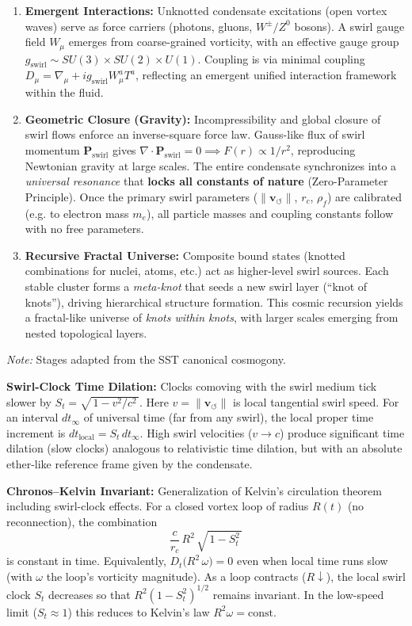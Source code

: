 \documentclass[10pt,a4paper]{article}
\begin{document}
\begin{tcolorbox}[title=\textbf{Cosmogenesis: Sevenfold Genesis of the Swirling Cosmos}]
\begin{enumerate}
\item \textbf{Emergent Interactions:} Unknotted condensate excitations (open vortex waves) serve as force carriers (photons, gluons, $W^\pm/Z^0$ bosons). A swirl gauge field $W_{\mu}$ emerges from coarse-grained vorticity, with an effective gauge group
$g_{\text{swirl}}\sim SU(3)\times SU(2)\times U(1)$. Coupling is via minimal coupling $D_\mu = \nabla_\mu + i g_{\text{swirl}} W^a_{\mu}T^a$, reflecting an emergent unified interaction framework within the fluid.
\item \textbf{Geometric Closure (Gravity):} Incompressibility and global closure of swirl flows enforce an inverse-square force law. Gauss-like flux of swirl momentum $\mathbf{P}_{\text{swirl}}$ gives $\nabla\cdot \mathbf{P}_{\text{swirl}}=0 \implies F(r)\propto 1/r^2$, reproducing Newtonian gravity at large scales. The entire condensate synchronizes into a \emph{universal resonance} that \textbf{locks all constants of nature} (Zero-Parameter Principle). Once the primary swirl parameters ($\| \mathbf{v}_{\!\boldsymbol{\circlearrowleft}}\|$, $r_c$, $\rho_{\!f}$) are calibrated (e.g. to electron mass $m_e$), all particle masses and coupling constants follow with no free parameters.
\item \textbf{Recursive Fractal Universe:} Composite bound states (knotted combinations for nuclei, atoms, etc.) act as higher-level swirl sources. Each stable cluster forms a \emph{meta-knot} that seeds a new swirl layer (``knot of knots''), driving hierarchical structure formation. This cosmic recursion yields a fractal-like universe of \emph{knots within knots}, with larger scales emerging from nested topological layers.
\end{enumerate}
    {\footnotesize \emph{Note:} Stages adapted from the SST canonical cosmogony\cite{Iskandarani2025_Constants}.}
\end{tcolorbox}

\noindent \textbf{Swirl-Clock Time Dilation:} Clocks comoving with the swirl medium tick slower by $S_t=\sqrt{\,1 - v^2/c^2\,}$. Here $v=\|\mathbf{v}_{\!\boldsymbol{\circlearrowleft}}\|$ is local tangential swirl speed. For an interval $dt_{\infty}$ of universal time (far from any swirl), the local proper time increment is $dt_{\text{local}} = S_t\,dt_{\infty}$. High swirl velocities ($v\to c$) produce significant time dilation (slow clocks) analogous to relativistic time dilation, but with an absolute ether-like reference frame given by the condensate.

\noindent \textbf{Chronos--Kelvin Invariant:} Generalization of Kelvin’s circulation theorem including swirl-clock effects. For a closed vortex loop of radius $R(t)$ (no reconnection), the combination
\[
    \frac{c}{r_c}\,R^2\,\sqrt{\,1 - S_t^2\,}
\]
is constant in time. Equivalently, $D_t\!\Big(R^2\,\omega\Big)=0$ even when local time runs slow (with $\omega$ the loop’s vorticity magnitude). As a loop contracts ($R\downarrow$), the local swirl clock $S_t$ decreases so that $R^2(1 - S_t^2)^{1/2}$ remains invariant. In the low-speed limit ($S_t\approx1$) this reduces to Kelvin’s law $R^2\omega=\text{const}$.
\end{document}
